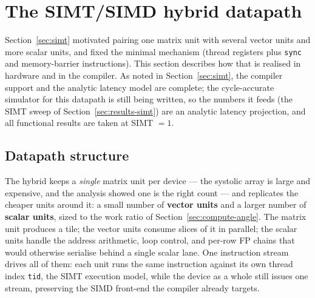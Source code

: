 \documentclass[11pt]{report}
\begin{document}
\section{The SIMT/SIMD hybrid datapath}
\label{sec:impl-simt}

Section~\ref{sec:simt} motivated pairing one matrix unit with several vector
units and more scalar units, and fixed the minimal mechanism (thread
registers plus \texttt{sync} and memory-barrier instructions). This section
describes how that is realised in hardware and in the compiler. As noted in
Section~\ref{sec:simt}, the compiler support and the analytic latency model
are complete; the cycle-accurate simulator for this datapath is still being
written, so the numbers it feeds (the SIMT sweep of
Section~\ref{sec:results-simt}) are an analytic latency projection, and all
functional results are taken at SIMT $=1$.

\subsection{Datapath structure}

The hybrid keeps a \emph{single} matrix unit per device --- the systolic
array is large and expensive, and the analysis showed one is the right count
--- and replicates the cheaper units around it: a small number of
\textbf{vector units} and a larger number of \textbf{scalar units}, sized to
the work ratio of Section~\ref{sec:compute-angle}. The matrix unit produces a
tile; the vector units consume slices of it in parallel; the scalar units
handle the address arithmetic, loop control, and per-row FP chains that would
otherwise serialise behind a single scalar lane. One instruction stream
drives all of them: each unit runs the same instruction against its own
thread index \texttt{tid}, the SIMT execution model, while the device as a
whole still issues one stream, preserving the SIMD front-end the compiler
already targets.
\end{document}
